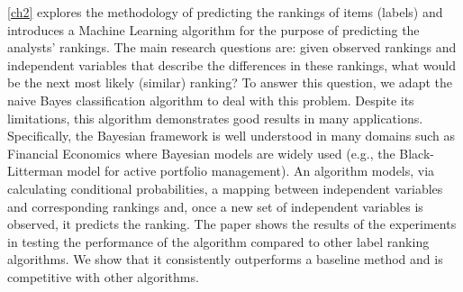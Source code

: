 \ref{ch2} explores the methodology  of predicting the rankings of items (labels) and introduces a Machine Learning algorithm for the purpose of predicting the analysts' rankings. The main research questions are: given observed rankings and independent variables that describe the differences in these rankings, what would be the next most likely (similar) ranking? To answer this question, we adapt the naive Bayes classification algorithm to deal with this problem. Despite its limitations, this algorithm demonstrates good results in many applications. Specifically, the Bayesian framework is well understood in many domains such as Financial Economics where Bayesian models are widely used (e.g., the Black-Litterman model for active portfolio management). An algorithm models, via calculating conditional probabilities, a mapping between independent variables and corresponding rankings and, once a new set of independent variables is observed, it predicts the ranking. The paper shows the results of the experiments in testing the performance of the algorithm compared to other label ranking algorithms. We show that it consistently outperforms a baseline method and is competitive with other algorithms.

